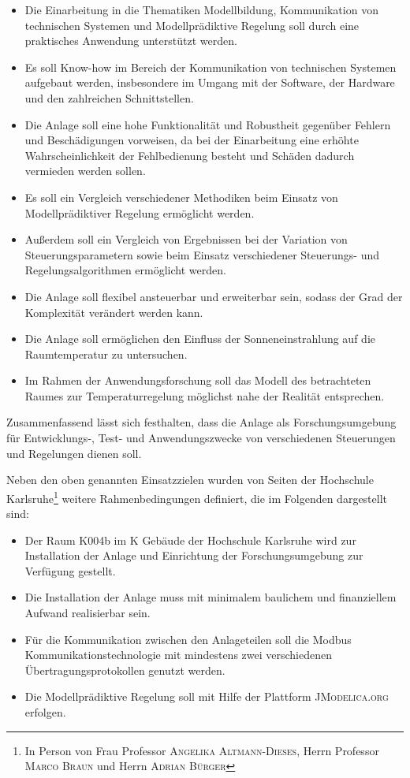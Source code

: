\begin{itemize}
	\item Die Einarbeitung in die Thematiken Modellbildung, Kommunikation von technischen Systemen und Modellprädiktive Regelung soll durch eine praktisches Anwendung unterstützt werden.
	\item Es soll Know-how im Bereich der Kommunikation von technischen Systemen aufgebaut werden, insbesondere im Umgang mit der Software, der Hardware und den zahlreichen Schnittstellen.
	\item Die Anlage soll eine hohe Funktionalität und Robustheit gegenüber Fehlern und Beschädigungen vorweisen, da bei der Einarbeitung eine erhöhte Wahrscheinlichkeit der Fehlbedienung besteht und Schäden dadurch vermieden werden sollen.
	\item Es soll ein Vergleich verschiedener Methodiken beim Einsatz von Modellprädiktiver Regelung ermöglicht werden.
	\item Außerdem soll ein Vergleich von Ergebnissen bei der Variation von Steuerungsparametern sowie beim Einsatz verschiedener Steuerungs- und Regelungsalgorithmen ermöglicht werden.
	\item Die Anlage soll flexibel ansteuerbar und erweiterbar sein, sodass der Grad der Komplexität verändert werden kann.
	\item Die Anlage soll ermöglichen den Einfluss der Sonneneinstrahlung auf die Raumtemperatur zu untersuchen.
	\item Im Rahmen der Anwendungsforschung soll das Modell des betrachteten Raumes zur Temperaturregelung möglichst nahe der Realität entsprechen.
\end{itemize}

Zusammenfassend lässt sich festhalten, dass die Anlage als Forschungsumgebung für Entwicklungs-, Test- und Anwendungszwecke von verschiedenen Steuerungen und Regelungen dienen soll.

Neben den oben genannten Einsatzzielen wurden von Seiten der Hochschule Karlsruhe\footnote{In Person von Frau Professor \textsc{Angelika Altmann-Dieses}, Herrn Professor \textsc{Marco Braun} und Herrn \textsc{Adrian Bürger}} weitere Rahmenbedingungen definiert, die im Folgenden dargestellt sind:

\begin{itemize}
	\item Der Raum K004b im K Gebäude der Hochschule Karlsruhe wird zur Installation der Anlage und Einrichtung der Forschungsumgebung zur Verfügung gestellt.
	\item Die Installation der Anlage muss mit minimalem baulichem und finanziellem Aufwand realisierbar sein.
	\item Für die Kommunikation zwischen den Anlageteilen soll die Modbus Kommunikationstechnologie mit mindestens zwei verschiedenen Übertragungsprotokollen genutzt werden.
	\item Die Modellprädiktive Regelung soll mit Hilfe der Plattform \textsc{JModelica.org} erfolgen.
\end{itemize}

